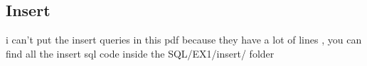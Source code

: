 \subsection*{Insert}
i can't put the insert queries in this pdf because they have a lot of lines , you can find all the insert sql code inside the SQL/EX1/insert/ folder

